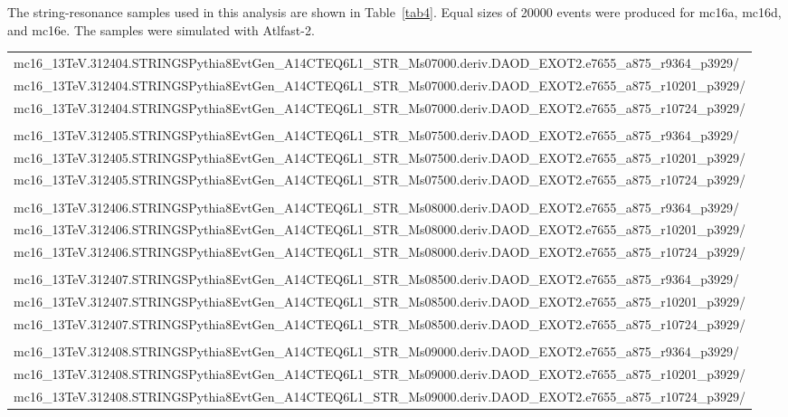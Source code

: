 The string-resonance samples used in this analysis are shown in
Table~\ref{tab4}. 
Equal sizes of 20000 events were produced for mc16a, mc16d, and mc16e.
The samples were simulated with Atlfast-2.

\begin{sidewaystable}[p]
\begin{small}
\begin{tabular}{l}
\hline
mc16\_13TeV.312404.STRINGSPythia8EvtGen\_A14CTEQ6L1\_STR\_Ms07000.deriv.DAOD\_EXOT2.e7655\_a875\_r9364\_p3929/\\
mc16\_13TeV.312404.STRINGSPythia8EvtGen\_A14CTEQ6L1\_STR\_Ms07000.deriv.DAOD\_EXOT2.e7655\_a875\_r10201\_p3929/\\
mc16\_13TeV.312404.STRINGSPythia8EvtGen\_A14CTEQ6L1\_STR\_Ms07000.deriv.DAOD\_EXOT2.e7655\_a875\_r10724\_p3929/\\
\\
mc16\_13TeV.312405.STRINGSPythia8EvtGen\_A14CTEQ6L1\_STR\_Ms07500.deriv.DAOD\_EXOT2.e7655\_a875\_r9364\_p3929/\\
mc16\_13TeV.312405.STRINGSPythia8EvtGen\_A14CTEQ6L1\_STR\_Ms07500.deriv.DAOD\_EXOT2.e7655\_a875\_r10201\_p3929/\\
mc16\_13TeV.312405.STRINGSPythia8EvtGen\_A14CTEQ6L1\_STR\_Ms07500.deriv.DAOD\_EXOT2.e7655\_a875\_r10724\_p3929/\\
\\
mc16\_13TeV.312406.STRINGSPythia8EvtGen\_A14CTEQ6L1\_STR\_Ms08000.deriv.DAOD\_EXOT2.e7655\_a875\_r9364\_p3929/\\
mc16\_13TeV.312406.STRINGSPythia8EvtGen\_A14CTEQ6L1\_STR\_Ms08000.deriv.DAOD\_EXOT2.e7655\_a875\_r10201\_p3929/\\
mc16\_13TeV.312406.STRINGSPythia8EvtGen\_A14CTEQ6L1\_STR\_Ms08000.deriv.DAOD\_EXOT2.e7655\_a875\_r10724\_p3929/\\
\\
mc16\_13TeV.312407.STRINGSPythia8EvtGen\_A14CTEQ6L1\_STR\_Ms08500.deriv.DAOD\_EXOT2.e7655\_a875\_r9364\_p3929/\\
mc16\_13TeV.312407.STRINGSPythia8EvtGen\_A14CTEQ6L1\_STR\_Ms08500.deriv.DAOD\_EXOT2.e7655\_a875\_r10201\_p3929/\\
mc16\_13TeV.312407.STRINGSPythia8EvtGen\_A14CTEQ6L1\_STR\_Ms08500.deriv.DAOD\_EXOT2.e7655\_a875\_r10724\_p3929/\\
\\
mc16\_13TeV.312408.STRINGSPythia8EvtGen\_A14CTEQ6L1\_STR\_Ms09000.deriv.DAOD\_EXOT2.e7655\_a875\_r9364\_p3929/\\
mc16\_13TeV.312408.STRINGSPythia8EvtGen\_A14CTEQ6L1\_STR\_Ms09000.deriv.DAOD\_EXOT2.e7655\_a875\_r10201\_p3929/\\
mc16\_13TeV.312408.STRINGSPythia8EvtGen\_A14CTEQ6L1\_STR\_Ms09000.deriv.DAOD\_EXOT2.e7655\_a875\_r10724\_p3929/\\
\hline
\end{tabular}
\end{small}
\caption{ATLAS Monte Carlo string-resonance samples.}
\label{tab4}
\end{sidewaystable}

